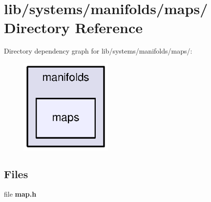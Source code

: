 \section{lib/systems/manifolds/maps/ \-Directory \-Reference}
\label{dir_8a026249474984152a40109727557232}
\-Directory dependency graph for lib/systems/manifolds/maps/\-:
\nopagebreak
\begin{figure}[H]
\begin{center}
\leavevmode
\includegraphics[width=130pt]{dir_8a026249474984152a40109727557232_dep}
\end{center}
\end{figure}
\subsection*{\-Files}
\begin{DoxyCompactItemize}
\item 
file {\bf map.\-h}
\end{DoxyCompactItemize}
